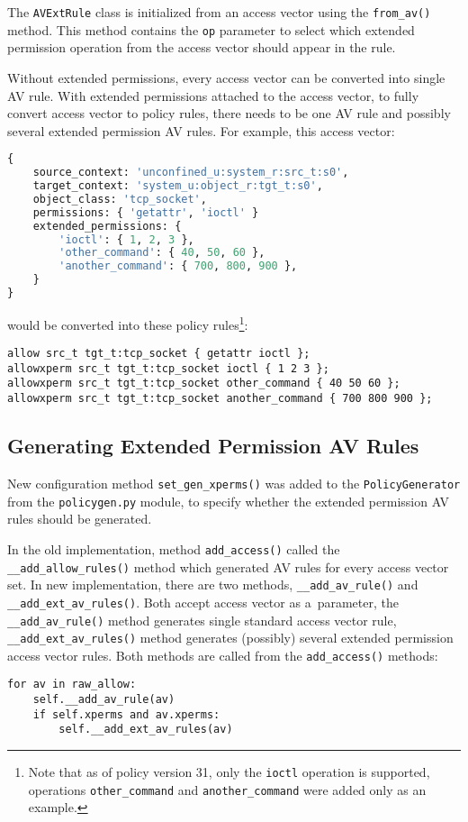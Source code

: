 The \texttt{AVExtRule} class is initialized from an access vector using the
\texttt{from\_av()} method. This method contains the \texttt{op} parameter to
select which extended permission operation from the access vector should appear
in the rule.

Without extended permissions, every access vector can be converted into single
AV rule. With extended permissions attached to the access vector, to fully
convert access vector to policy rules, there needs to be one AV rule and
possibly several extended permission AV rules. For example, this access vector:
\begin{lstlisting}[language=Python]
{
    source_context: 'unconfined_u:system_r:src_t:s0',
    target_context: 'system_u:object_r:tgt_t:s0',
    object_class: 'tcp_socket',
    permissions: { 'getattr', 'ioctl' }
    extended_permissions: {
        'ioctl': { 1, 2, 3 },
        'other_command': { 40, 50, 60 },
        'another_command': { 700, 800, 900 },
    }
}
\end{lstlisting}
would be converted into these policy rules\footnote{Note that as of policy
version 31, only the \texttt{ioctl} operation is supported, operations
\texttt{other\_command} and \texttt{another\_command} were added only as an
example.}:
\begin{lstlisting}
allow src_t tgt_t:tcp_socket { getattr ioctl };
allowxperm src_t tgt_t:tcp_socket ioctl { 1 2 3 };
allowxperm src_t tgt_t:tcp_socket other_command { 40 50 60 };
allowxperm src_t tgt_t:tcp_socket another_command { 700 800 900 };
\end{lstlisting}

\subsection{Generating Extended Permission AV Rules}
New configuration method \texttt{set\_gen\_xperms()} was added to the
\texttt{PolicyGenerator} from the \texttt{policygen.py} module, to specify
whether the extended permission AV rules should be generated.

In the old implementation, method \texttt{add\_access()} called the
\texttt{\_\_add\_allow\_rules()} method which generated AV rules for every
access vector set. In new implementation, there are two methods,
\texttt{\_\_add\_av\_rule()} and \texttt{\_\_add\_ext\_av\_rules()}. Both accept
access vector as a~parameter, the \texttt{\_\_add\_av\_rule()} method generates
single standard access vector rule, \texttt{\_\_add\_ext\_av\_rules()} method
generates (possibly) several extended permission access vector rules. Both
methods are called from the \texttt{add\_access()} methods:
\begin{lstlisting}
for av in raw_allow:
    self.__add_av_rule(av)
    if self.xperms and av.xperms:
        self.__add_ext_av_rules(av)
\end{lstlisting}


